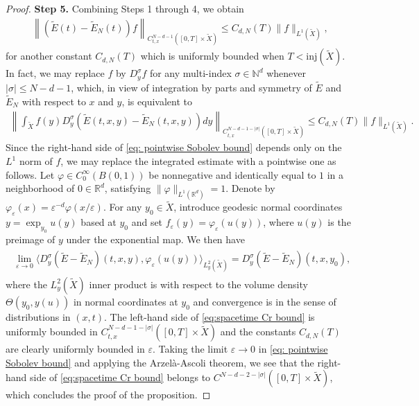 \documentclass[11pt,letterpaper,oneside]{amsart}
\newcommand{\N}{\mathbb{N}}
\newcommand{\R}{\mathbb{R}}
\newcommand{\inj}{\text{inj}}
\renewcommand{\phi}{\varphi}
\theoremstyle{definition}
\theoremstyle{remark}
\newcommand{\eps}{\varepsilon}
\newcommand{\wt}{\widetilde}
\theoremstyle{definition}
\theoremstyle{remark}
\begin{document}
\begin{proof}
    \noindent \textbf{Step 5.} Combining Steps 1 through 4, we obtain
    \begin{align*}
    \left \| \left(\wt E(t) - \wt E_N(t) \right) f \right \|_{C_{t,x}^{N - d - 1}([0,T] \times \wt X)} \leq C_{d, N}(T) \|f\|_{L^1(\wt X)},
    \end{align*}
    for another constant $C_{d,N}(T)$ which is uniformly bounded when $T < \inj(\wt X)$. In fact, we may replace $f$ by $D_y^\sigma f$ for any multi-index $\sigma \in \N^d$ whenever $|\sigma| \leq N - d - 1$, which, in view of integration by parts and symmetry of $\wt E$ and $\wt E_N$ with respect to $x$ and $y$, is equivalent to
    \begin{align}
    \label{eq: pointwise Sobolev bound}
    \left \| \int_{\wt X} f(y) D_y^\sigma \left(\wt E(t,x,y) - \wt E_N(t,x,y)\right) dy \right\|_{C_{t,x}^{N - d - 1 - |\sigma|} ([0,T] \times \wt X)} \leq C_{d,N}(T) \|f\|_{L^1(\wt X)}.
    \end{align}
    Since the right-hand side of \eqref{eq: pointwise Sobolev bound} depends only on the $L^1$ norm of $f$, we may replace the integrated estimate with a pointwise one as follows. Let $\phi \in C_0^\infty(B(0,1))$ be nonnegative and identically equal to $1$ in a neighborhood of $0 \in \R^d$, satisfying $\|\phi\|_{L^1(\R^d)} = 1$. Denote by $\phi_\eps(x) = \eps^{-d} \phi(x/\eps)$. For any $y_0 \in \wt X$, introduce geodesic normal coordinates $y = \exp_{y_0} u(y)$ based at $y_0$ and set $f_\eps(y) = \phi_\eps(u(y))$, where $u(y)$ is the preimage of $y$ under the exponential map. We then have
    \begin{align}
    \label{eq:spacetime Cr bound}
    \begin{split}
     \lim_{\eps \to 0} \langle D_y^{\sigma} (\wt E - \wt E_N) (t,x,y),  \phi_\eps(u(y)) \rangle_{L_y^2(\wt X)}
    = D_y^\sigma \left( \wt E - \wt E_N \right)(t,x,y_0),
    \end{split}
    \end{align}
    where the $L_y^2(\wt X)$ inner product is with respect to the volume density $\Theta(y_0, y(u))$ in normal coordinates at $y_0$ and convergence is in the sense of distributions in $(x,t)$. The left-hand side of \eqref{eq:spacetime Cr bound} is uniformly bounded in $C_{t,x}^{N - d - 1 - |\sigma|}([0,T] \times \wt X)$ and the constants $C_{d,N}(T)$ are clearly uniformly bounded in $\eps$. Taking the limit $\eps \to 0$ in \eqref{eq: pointwise Sobolev bound} and applying the Arzel\`a-Ascoli theorem, we see that the right-hand side of \eqref{eq:spacetime Cr bound} belongs to $C^{N - d - 2 - |\sigma|}([0,T] \times \wt X)$, which concludes the proof of the proposition.
\end{proof}
\end{document}
